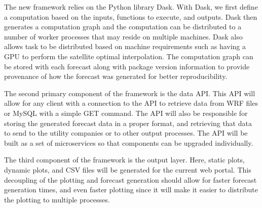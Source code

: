 The new framework relies on the Python library Dask.
With Dask, we first define a computation based on the inputs,
functions to execute, and outputs.
Dask then generates a computation graph and the computation can be
distributed to a number of worker processes that may reside on
multiple machines.
Dask also allows task to be distributed based on machine requirements
such as having a GPU to perform the satellite optimal interpolation.
The computation graph can be stored with each forecast along with
package version information to provide provenance of how the forecast
was generated for better reproducibility.

The second primary component of the framework is the data API.
This API will allow for any client with a connection to the API to
retrieve data from WRF files or MySQL with a simple GET command.
The API will also be responsible for storing the generated forecast
data in a proper format, and retrieving that data to send to the
utility companies or to other output processes.
The API will be built as a set of microservices so that components can
be upgraded individually.

The third component of the framework is the output layer.
Here, static plots, dynamic plots, and CSV files will be generated for
the current web portal.
This decoupling of the plotting and forecast generation should allow
for faster forecast generation times, and even faster plotting since
it will make it easier to distribute the plotting to multiple
processes.




